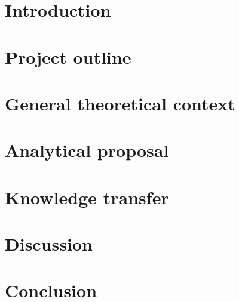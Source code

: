 \documentclass[12pt]{article}
\begin{document}
\vfill

\listoffigures

\vfill

\listoftables

\newpage


    
\section{Introduction}
\label{intro}


\section{Project outline}
\label{project}


\section{General theoretical context}
\label{theory}


\section{Analytical proposal}
\label{analysis}


\section{Knowledge transfer}
\label{teaching}


\section{Discussion}
\label{discussion}


\section{Conclusion}
\label{conclusion}


\newpage

    
\end{document}
